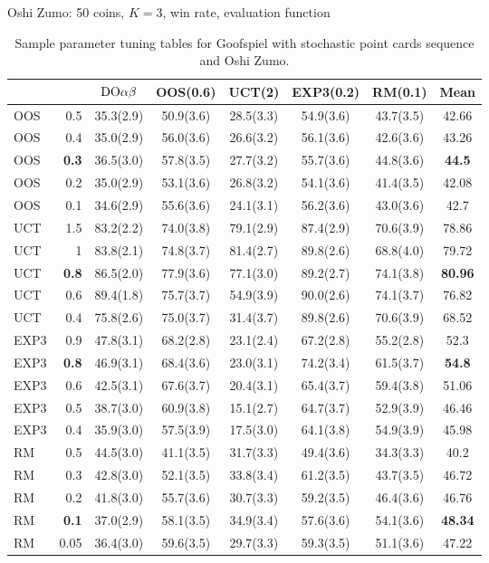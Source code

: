 \begin{table}[t!]
\begin{scriptsize}
Oshi Zumo: 50 coins, $K=3$, win rate, evaluation function
\begin{tabular}{|lr|ccccc|c|}\hline
&&$\textrm{DO}\alpha\beta$&OOS(0.6)&UCT(2)&EXP3(0.2)&RM(0.1)&Mean\\\hline
OOS&0.5&35.3(2.9)&50.9(3.6)&28.5(3.3)&54.9(3.6)&43.7(3.5)&42.66\\
OOS&0.4&35.0(2.9)&56.0(3.6)&26.6(3.2)&56.1(3.6)&42.6(3.6)&43.26\\
OOS&\textbf{0.3}&36.5(3.0)&57.8(3.5)&27.7(3.2)&55.7(3.6)&44.8(3.6)&\textbf{44.5}\\
OOS&0.2&35.0(2.9)&53.1(3.6)&26.8(3.2)&54.1(3.6)&41.4(3.5)&42.08\\
OOS&0.1&34.6(2.9)&55.6(3.6)&24.1(3.1)&56.2(3.6)&43.0(3.6)&42.7\\\hline
UCT&1.5&83.2(2.2)&74.0(3.8)&79.1(2.9)&87.4(2.9)&70.6(3.9)&78.86\\
UCT&1&83.8(2.1)&74.8(3.7)&81.4(2.7)&89.8(2.6)&68.8(4.0)&79.72\\
UCT&\textbf{0.8}&86.5(2.0)&77.9(3.6)&77.1(3.0)&89.2(2.7)&74.1(3.8)&\textbf{80.96}\\
UCT&0.6&89.4(1.8)&75.7(3.7)&54.9(3.9)&90.0(2.6)&74.1(3.7)&76.82\\
UCT&0.4&75.8(2.6)&75.0(3.7)&31.4(3.7)&89.8(2.6)&70.6(3.9)&68.52\\\hline
EXP3&0.9&47.8(3.1)&68.2(2.8)&23.1(2.4)&67.2(2.8)&55.2(2.8)&52.3\\
EXP3&\textbf{0.8}&46.9(3.1)&68.4(3.6)&23.0(3.1)&74.2(3.4)&61.5(3.7)&\textbf{54.8}\\
EXP3&0.6&42.5(3.1)&67.6(3.7)&20.4(3.1)&65.4(3.7)&59.4(3.8)&51.06\\
EXP3&0.5&38.7(3.0)&60.9(3.8)&15.1(2.7)&64.7(3.7)&52.9(3.9)&46.46\\
EXP3&0.4&35.9(3.0)&57.5(3.9)&17.5(3.0)&64.1(3.8)&54.9(3.9)&45.98\\\hline
RM&0.5&44.5(3.0)&41.1(3.5)&31.7(3.3)&49.4(3.6)&34.3(3.3)&40.2\\
RM&0.3&42.8(3.0)&52.1(3.5)&33.8(3.4)&61.2(3.5)&43.7(3.5)&46.72\\
RM&0.2&41.8(3.0)&55.7(3.6)&30.7(3.3)&59.2(3.5)&46.4(3.6)&46.76\\
RM&\textbf{0.1}&37.0(2.9)&58.1(3.5)&34.9(3.4)&57.6(3.6)&54.1(3.6)&\textbf{48.34}\\
RM&0.05&36.4(3.0)&59.6(3.5)&29.7(3.3)&59.3(3.5)&51.1(3.6)&47.22\\
\hline
\end{tabular}

\end{scriptsize}
\caption{Sample parameter tuning tables for Goofspiel with stochastic point cards sequence and Oshi Zumo.}\label{fig:tuning}
\end{table}

